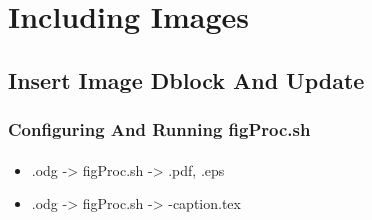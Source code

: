 \begin{comment}
*  [[elisp:(org-cycle)][| ]] [[elisp:(org-show-subtree)][|=]] [[elisp:(show-children 10)][|V]] [[elisp:(bx:orgm:indirectBufOther)][|>]] [[elisp:(bx:orgm:indirectBufMain)][|I]] [[elisp:(blee:ppmm:org-mode-toggle)][|N]] [[elisp:(org-top-overview)][|O]] [[elisp:(progn (org-shifttab) (org-content))][|C]] [[elisp:(delete-other-windows)][|1]]  /Section/   Including Images ::  [[elisp:(org-cycle)][| ]]
\end{comment}

\section{Including Images}


\begin{comment}
**  [[elisp:(org-cycle)][| ]] [[elisp:(org-show-subtree)][|=]] [[elisp:(show-children 10)][|V]] [[elisp:(bx:orgm:indirectBufOther)][|>]] [[elisp:(bx:orgm:indirectBufMain)][|I]] [[elisp:(blee:ppmm:org-mode-toggle)][|N]] [[elisp:(org-top-overview)][|O]] [[elisp:(progn (org-shifttab) (org-content))][|C]] [[elisp:(delete-other-windows)][|1]]  /Subsection/   Insert Image Dblock And Update ::  [[elisp:(org-cycle)][| ]]
\end{comment}

\subsection{Insert Image Dblock And Update}



\begin{comment}
*****  [[elisp:(org-cycle)][| ]]  [[elisp:(blee:ppmm:org-mode-toggle)][Nat]] [[elisp:(beginning-of-buffer)][Top]] [[elisp:(delete-other-windows)][(1)]] || /Frame/ *Label=ConfiguringAndRunningfigProc.sh*  Configuring And Running figProc.sh ::  [[elisp:(org-cycle)][| ]]
\end{comment}

\begin{frame}[fragile,label=ConfiguringAndRunningfigProc.sh]
    \frametitle{Configuring And Running figProc.sh}
    \framesubtitle{}


    \begin{itemize}
    \item .odg  -> figProc.sh -> .pdf, .eps
    \item .odg  -> figProc.sh -> -caption.tex      
    \end{itemize}

  \end{frame}


